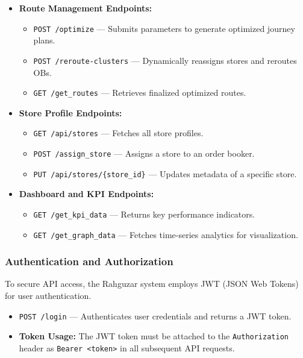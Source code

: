 \begin{itemize}
    \item \textbf{Route Management Endpoints:}
    \begin{itemize}
        \item \texttt{POST /optimize} — Submits parameters to generate optimized journey plans.
        \item \texttt{POST /reroute-clusters} — Dynamically reassigns stores and reroutes OBs.
        \item \texttt{GET /get\_routes} — Retrieves finalized optimized routes.
    \end{itemize}

    \item \textbf{Store Profile Endpoints:}
    \begin{itemize}
        \item \texttt{GET /api/stores} — Fetches all store profiles.
        \item \texttt{POST /assign\_store} — Assigns a store to an order booker.
        \item \texttt{PUT /api/stores/\{store\_id\}} — Updates metadata of a specific store.
    \end{itemize}

    \item \textbf{Dashboard and KPI Endpoints:}
    \begin{itemize}
        \item \texttt{GET /get\_kpi\_data} — Returns key performance indicators.
        \item \texttt{GET /get\_graph\_data} — Fetches time-series analytics for visualization.
    \end{itemize}
\end{itemize}

\subsubsection{Authentication and Authorization}
To secure API access, the Rahguzar system employs JWT (JSON Web Tokens) for user authentication.

\begin{itemize}
    \item \texttt{POST /login} — Authenticates user credentials and returns a JWT token.
    \item \textbf{Token Usage:} The JWT token must be attached to the \texttt{Authorization} header as \texttt{Bearer <token>} in all subsequent API requests.
\end{itemize}

